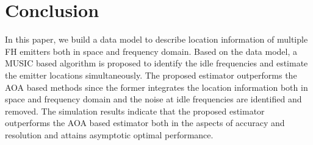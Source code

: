 \documentclass[journal,10pt]{IEEEtran}
\begin{document}



\section{Conclusion}
\label{sec:conclusion}
In this paper, we build a data model to describe location information of multiple FH emitters both in space and frequency domain. Based on the data model, a MUSIC based algorithm is proposed to identify the idle frequencies and estimate the emitter locations simultaneously.
The proposed estimator outperforms the AOA based methods since the former integrates the location information both in space and frequency domain and the noise at idle frequencies are identified and removed.
The simulation results indicate that the proposed estimator outperforms the AOA based estimator both in the aspects of accuracy and resolution and attains asymptotic optimal performance. 

\newpage



\balance
\end{document}
